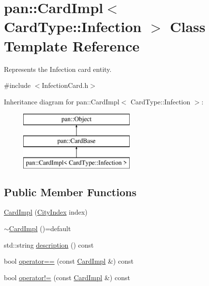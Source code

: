 \hypertarget{classpan_1_1_card_impl_3_01_card_type_1_1_infection_01_4}{}\section{pan\+:\+:Card\+Impl$<$ Card\+Type\+:\+:Infection $>$ Class Template Reference}
\label{classpan_1_1_card_impl_3_01_card_type_1_1_infection_01_4}


Represents the Infection card entity.  




{\ttfamily \#include $<$Infection\+Card.\+h$>$}

Inheritance diagram for pan\+:\+:Card\+Impl$<$ Card\+Type\+:\+:Infection $>$\+:\begin{figure}[H]
\begin{center}
\leavevmode
\includegraphics[height=3.000000cm]{classpan_1_1_card_impl_3_01_card_type_1_1_infection_01_4}
\end{center}
\end{figure}
\subsection*{Public Member Functions}
\begin{DoxyCompactItemize}
\item 
\hyperlink{classpan_1_1_card_impl_3_01_card_type_1_1_infection_01_4_a949201ae0814de52ad3c126a189b0f74}{Card\+Impl} (\hyperlink{namespacepan_afaed28aa6603153dcc062a028602d697}{City\+Index} index)
\item 
\hyperlink{classpan_1_1_card_impl_3_01_card_type_1_1_infection_01_4_ae3fe3d61f83d4f5a79a08d0dad43b9c2}{$\sim$\+Card\+Impl} ()=default
\item 
std\+::string \hyperlink{classpan_1_1_card_impl_3_01_card_type_1_1_infection_01_4_a5e31904120b655ce59633433a4d4c17c}{description} () const
\item 
bool \hyperlink{classpan_1_1_card_impl_3_01_card_type_1_1_infection_01_4_a868c2a678649606cb485ab66e47f0eb2}{operator==} (const \hyperlink{classpan_1_1_card_impl}{Card\+Impl} \&) const
\item 
bool \hyperlink{classpan_1_1_card_impl_3_01_card_type_1_1_infection_01_4_ae372e0ba38c16ccb791c0f951731f056}{operator!=} (const \hyperlink{classpan_1_1_card_impl}{Card\+Impl} \&) const
\end{DoxyCompactItemize}

